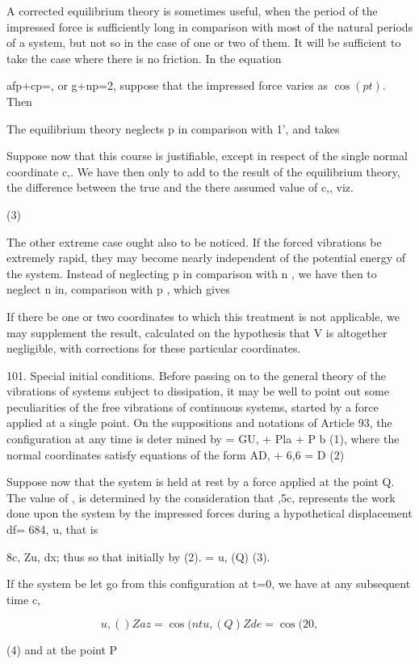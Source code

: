 A corrected equilibrium theory is sometimes useful, when the period of the
impressed force is sufficiently long in comparison with most of the natural
periods of a system, but not so in the case of one or two of them. It will be
sufficient to take the case where there is no friction.  In the equation

afp+cp=, or g+np=2, suppose that the impressed force varies as \(\cos(pt)\).
Then

The equilibrium theory neglects p in comparison with 1', and takes

Suppose now that this course is justifiable, except in respect of the single
normal coordinate c,. We have then only to add to the result of the equilibrium
theory, the difference between the true and the there assumed value of c,, viz.

(3)

The other extreme case ought also to be noticed. If the forced vibrations be
extremely rapid, they may become nearly independent of the potential energy of
the system. Instead of neglecting p in comparison with n , we have then to
neglect n in, comparison with p , which gives

If there be one or two coordinates to which this treatment is not applicable,
we may supplement the result, calculated on the hypothesis that V is altogether
negligible, with corrections for these particular coordinates.

101.  Special initial conditions.
Before passing on to the general theory of the vibrations of systems
subject to dissipation, it may be well to point out some peculiarities of the
free vibrations of continuous systems, started by a force applied at a single
point. On the suppositions and notations of Article 93, the configuration at
any time is deter mined by = GU, + Pla + P b (1), where the normal coordinates
satisfy equations of the form AD, + 6,6 = D (2)

Suppose now that the system is held at rest by a force applied at the point Q.
The value of , is determined by the consideration that ,5c, represents the work
done upon the system by the impressed forces during a hypothetical displacement
df= 684, u, that is

8c, Zu, dx; thus so that initially by (2). = u, (Q) (3).

If the system be let go from this configuration at t=0, we have at any
subsequent time c,

\[u, ()  Zaz = \cos(nt u,(Q)  Zde = \cos(20,\]

(4) and at the point P

